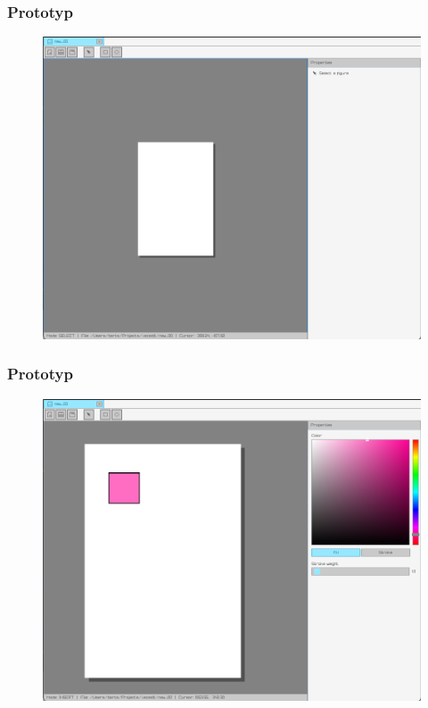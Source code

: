\documentclass[
	11pt,]{beamer}
\begin{document}
\begin{frame}
	\frametitle{Prototyp}
	
	\begin{figure}
		\includegraphics[height=0.7\textheight]{figures/pro2.png}
	\end{figure}
\end{frame}

\begin{frame}
	\frametitle{Prototyp}
	
	\begin{figure}
		\includegraphics[height=0.7\textheight]{figures/pro3.png}
	\end{figure}
\end{frame}
\end{document}
